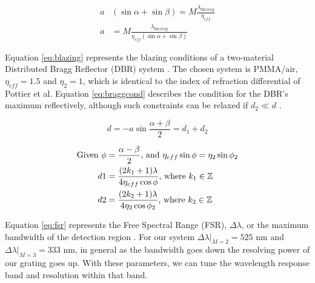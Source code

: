 \documentclass{article}
\begin{document}
        \begin{equation}
           \begin{aligned}\label{eq:rowlandcond}
            a &(\sin{\alpha} + \sin{\beta})= M \frac{\lambda_{blazing}}{\eta_{eff}} \\
            a &= M \frac{\lambda_{blazing}}{\eta_{eff} (\sin{\alpha} + \sin{\beta})}
        \end{aligned}
        \end{equation}
     
        Equation \ref{eq:blazing} represents the blazing conditions of a two-material Distributed Bragg Reflector (DBR) system \cite{Packirisamy2012Mono-OrderGrating}. The chosen system is PMMA/air, $\eta_{eff} = 1.5$ and $\eta_{2} = 1$, which is identical to the index of refraction differential of Pottier et al. Equation \ref{eq:braggcond} describes the condition for the DBR's maximum reflectively, although such constraints can be relaxed if $d_2 \ll d$ \cite{Packirisamy2013DesignMirrors, Packirisamy2012Mono-OrderGrating}. 
        
        \begin{equation}
           \label{eq:blazing}
            d = -a \sin{\frac{\alpha + \beta}{2}} = d_1+d_2 
        \end{equation}
        
        \begin{equation}
           \begin{aligned}\label{eq:braggcond}
           \text{Given }\phi &= \frac{\alpha - \beta}{2} \text{, and } \eta_{eff} \sin{\phi} = \eta_{2} \sin{\phi_2}\\
            d1 &=  \frac{(2 k_1 +1) \lambda}{4 \eta_{eff} \cos{\phi}} \text{, where $ {k_1} \in \mathbb{Z}$} \\
            d2 &=  \frac{(2 k_2 +1) \lambda}{4 \eta_{2} \cos{\phi_2}} \text{, where $ {k_2} \in \mathbb{Z}$}
         \end{aligned}
        \end{equation}
        
        Equation \ref{eq:fsr} represents the Free Spectral Range (FSR), $\Delta \lambda$, or the maximum bandwidth of the detection region \cite{Mao2019PerfectPlatform}. For our system $\Delta \lambda \rvert_{M=2} = 525$ nm and $\Delta \lambda \rvert_{M=3} = 333$ nm, in general as the bandwidth goes down the resolving power of our grating goes up. With these parameters, we can tune the wavelength response band and resolution within that band.
        
\end{document}
